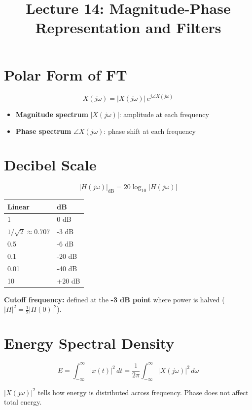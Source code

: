 \documentclass[11pt]{article}
\title{Lecture 14: Magnitude-Phase Representation and Filters}
\author{}
\date{}
\begin{document}
\maketitle

\section*{Polar Form of FT}

\[X(j\omega) = |X(j\omega)| \, e^{j\angle X(j\omega)}\]

\begin{itemize}
  \item \textbf{Magnitude spectrum} $|X(j\omega)|$: amplitude at each frequency
  \item \textbf{Phase spectrum} $\angle X(j\omega)$: phase shift at each frequency
\end{itemize}

\section*{Decibel Scale}

\[|H(j\omega)|_{\text{dB}} = 20 \log_{10} |H(j\omega)|\]

\begin{center}
\begin{tabular}{|l|l|}
\hline
\textbf{Linear} & \textbf{dB} \\
\hline
1 & 0 dB \\
\hline
$1/\sqrt{2} \approx 0.707$ & -3 dB \\
\hline
0.5 & -6 dB \\
\hline
0.1 & -20 dB \\
\hline
0.01 & -40 dB \\
\hline
10 & +20 dB \\
\hline
\end{tabular}
\end{center}

\textbf{Cutoff frequency:} defined at the \textbf{-3 dB point} where power is halved ($|H|^2 = \frac{1}{2}|H(0)|^2$).

\section*{Energy Spectral Density}

\[E = \int_{-\infty}^{\infty} |x(t)|^2 \, dt = \frac{1}{2\pi} \int_{-\infty}^{\infty} |X(j\omega)|^2 \, d\omega\]

$|X(j\omega)|^2$ tells how energy is distributed across frequency. Phase does not affect total energy.
\end{document}

